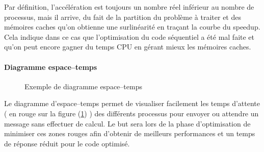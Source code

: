 \documentclass[fleqn,11pt]{article}
\begin{document}
Par définition, l'accélération est toujours un nombre réel inférieur au nombre de processus, mais il arrive, du fait
de la partition du problème à traiter et des mémoires caches qu'on obtienne une surlinéarité en traçant
la courbe du speedup. Cela indique dans ce cas que l'optimisation du code séquentiel a été mal faite
et qu'on peut encore gagner du temps CPU en gérant mieux les mémoires caches.

\paragraph{Diagramme espace--temps}

\begin{figure}[htbp]
\centering
{}
\caption{Exemple de diagramme espace--temps}
\label{fig::spacetimediag}
\end{figure}

Le diagramme d'espace--temps permet de visualiser facilement les temps d'attente ( en rouge sur la figure (\ref{fig::spacetimediag}) )
des différents processus pour envoyer ou attendre un message sans effectuer de calcul. Le but sera lors de la phase d'optimisation
de minimiser ces zones rouges afin d'obtenir de meilleurs performances et un temps de réponse réduit pour le code optimisé.
\end{document}
